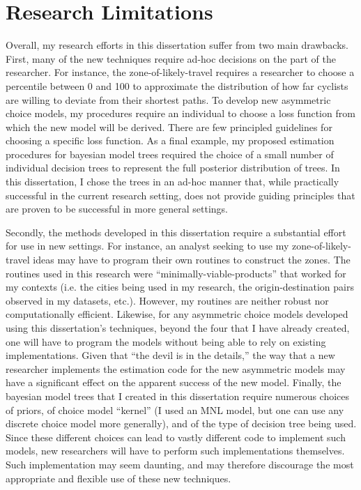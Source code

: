 \documentclass{article}
\begin{document}
\section{Research Limitations}
Overall, my research efforts in this dissertation suffer from two main drawbacks. First, many of the new techniques require ad-hoc decisions on the part of the researcher. For instance, the zone-of-likely-travel requires a researcher to choose a percentile between 0 and 100 to approximate the distribution of how far cyclists are willing to deviate from their shortest paths. To develop new asymmetric choice models, my procedures require an individual to choose a loss function from which the new model will be derived. There are few principled guidelines for choosing a specific loss function. As a final example, my proposed estimation procedures for bayesian model trees required the choice of a small number of individual decision trees to represent the full posterior distribution of trees. In this dissertation, I chose the trees in an ad-hoc manner that, while practically successful in the current research setting, does not provide guiding principles that are proven to be successful in more general settings.

Secondly, the methods developed in this dissertation require a substantial effort for use in new settings. For instance, an analyst seeking to use my zone-of-likely-travel ideas may have to program their own routines to construct the zones. The routines used in this research were ``minimally-viable-products'' that worked for my contexts (i.e. the cities being used in my research, the origin-destination pairs observed in my datasets, etc.). However, my routines are neither robust nor computationally efficient. Likewise, for any asymmetric choice models developed using this dissertation's techniques, beyond the four that I have already created, one will have to program the models without being able to rely on existing implementations. Given that ``the devil is in the details,'' the way that a new researcher implements the estimation code for the new asymmetric models may have a significant effect on the apparent success of the new model. Finally, the bayesian model trees that I created in this dissertation require numerous choices of priors, of choice model ``kernel'' (I used an MNL model, but one can use any discrete choice model more generally), and of the type of decision tree being used. Since these different choices can lead to vastly different code to implement such models, new researchers will have to perform such implementations themselves. Such implementation may seem daunting, and may therefore discourage the most appropriate and flexible use of these new techniques.
\end{document}

